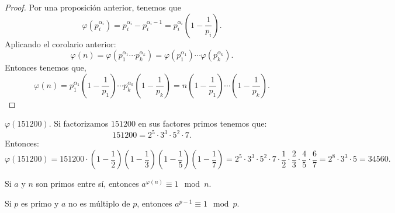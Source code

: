 \begin{proof}
Por una proposición anterior, tenemos que 
\[\varphi\left(p_{i}^{\alpha_{i}}\right) = p_{i}^{\alpha_{i}}-p_{i}^{\alpha_{i}-1} = p_{i}^{\alpha_{i}}\left(1-\frac{1}{p_{i}}\right) .\]
Aplicando el corolario anterior:
\[\varphi\left(n\right) = \varphi\left(p_{1}^{\alpha_{1}} \cdots p_{k}^{\alpha_{k}}\right) = \varphi\left(p_{1}^{\alpha_{1}}\right)\cdots\varphi\left(p_{k}^{\alpha_{k}}\right) .\]
Entonces tenemos que, 
\[\varphi\left(n\right) = p_{1}^{\alpha_{1}}\left(1 - \frac{1}{p_{1}}\right) \cdots p_{k}^{\alpha_{k}}\left(1 - \frac{1}{p_{k}}\right) = n \left(1-\frac{1}{p_{1}}\right)\cdots\left(1 - \frac{1}{p_{k}}\right) .\]
\end{proof}

\begin{eg}
\normalfont $\displaystyle \varphi\left(151200\right) $. Si factorizamos $\displaystyle 151200 $ en sus factores primos tenemos que:
\[151200 = 2^{5} \cdot 3^{3} \cdot 5^{2} \cdot 7 .\]
Entonces:
\[\varphi\left(151200\right) = 151200 \cdot \left(1-\frac{1}{2}\right)\left(1-\frac{1}{3}\right)\left(1-\frac{1}{5}\right)\left(1-\frac{1}{7}\right) =2^{5} \cdot 3^{3} \cdot 5^{2} \cdot 7 \cdot \frac{1}{2} \cdot \frac{2}{3} \cdot \frac{4}{5} \cdot \frac{6}{7} = 2^{8} \cdot 3^{3} \cdot 5 = 34560.\]
\end{eg}

\begin{ftheorem}
\normalfont Si $\displaystyle a $ y $\displaystyle n $ son primos entre sí, entonces $\displaystyle a^{\varphi\left(n\right)} \equiv 1 \mod n $. 
\end{ftheorem}

\begin{fcolorary}
\normalfont Si $\displaystyle p $ es primo y $\displaystyle a $ no es múltiplo de $\displaystyle p $, entonces $\displaystyle a^{p-1} \equiv 1 \mod p $.
\end{fcolorary}

